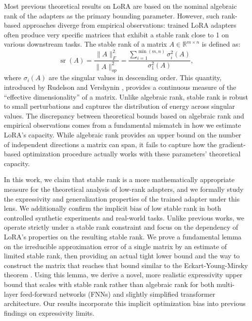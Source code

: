 \documentclass[a4paper,14pt]{extarticle}
\DeclareMathOperator{\sr}{sr}
\begin{document}
    Most previous theoretical results on LoRA are based on the nominal algebraic rank of the adapters as the primary bounding parameter. 
    However, such rank-based approaches diverge from empirical observations: trained LoRA adapters often produce very specific matrices that exhibit a stable rank close to 1 \cite{lion2025polar} on various downstream tasks. 
    The stable rank of a matrix $A \in \mathbb{R}^{m \times n}$ is defined as:
    \begin{equation}
        \sr(A) = \frac{\|A\|_F^2}{\|A\|_{op}^2} = \frac{\sum_{i=1}^{\min(m,n)} \sigma_i^2(A)}{\sigma_1^2(A)},
    \end{equation}
    where $\sigma_i(A)$ are the singular values in descending order. 
    This quantity, introduced by Rudelson and Vershynin \cite{rudelson2007sampling}, provides a continuous measure of the ``effective dimensionality'' of a matrix. 
    Unlike algebraic rank, stable rank is robust to small perturbations and captures the distribution of energy across singular values. 
    The discrepancy between theoretical bounds based on algebraic rank and empirical observations comes from a fundamental mismatch in how we estimate LoRA's capacity. 
    While algebraic rank provides an upper bound on the number of independent directions a matrix can span, it fails to capture how the gradient-based optimization procedure actually works with these parameters' theoretical capacity. 

    In this work, we claim that stable rank is a more mathematically appropriate measure for the theoretical analysis of low-rank adapters, and we formally study the expressivity and generalization properties of the trained adapter under this lens. 
    We additionally confirm the implicit bias of low stable rank in both controlled synthetic experiments and real-world tasks. 
    Unlike previous works, we operate strictly under a stable rank constraint and focus on the dependency of LoRA's properties on the resulting stable rank. 
    We prove a fundamental lemma on the irreducible approximation error of a single matrix by an estimate of limited stable rank, then providing an actual tight lower bound and the way to construct the matrix that reaches that bound similar to the Eckart-Young-Mirsky theorem \cite{EckartYoung1936}. Using this lemma, we derive a novel, more realistic expressivity upper bound that scales with stable rank rather than algebraic rank for both multi-layer feed-forward networks (FNNs) and slightly simplified transformer \cite{vaswani2023attentionneed} architecture. 
    Our results incorporate this implicit optimization bias into previous findings on expressivity limits. 
\end{document}
